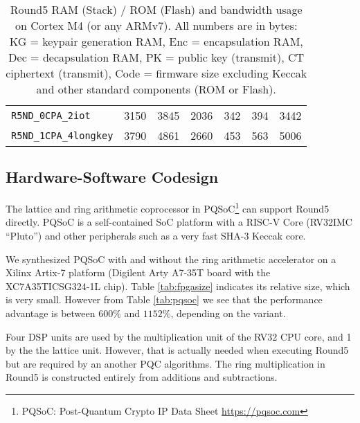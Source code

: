 \documentclass[a4paper]{article}
\begin{document}
\begin{table}
\begin{center}
\begin{tabular}{| l | n{5}{0} n{5}{0} n{5}{0} | n{5}{0} n{5}{0} | n{5}{0} | }
	\verb|R5ND_0CPA_2iot| & 3150  & 3845 & 2036 & 342	& 394	& 3442	\\
	\verb|R5ND_1CPA_4longkey| & 3790 & 4861 & 2660 & 453 & 563	& 5006	\\
	\hline
	\end{tabular}
	\caption{Round5 RAM (Stack) / ROM (Flash) and bandwidth usage on
		Cortex M4 (or any ARMv7). All numbers are in bytes:
		{KG} = keypair generation RAM,	{Enc} = encapsulation RAM,
		{Dec} = decapsulation RAM,		{PK} = public key (transmit),
		{CT} ciphertext (transmit),		{Code} = firmware size excluding
		Keccak and other standard  components (ROM or Flash).}
	\label{tab:m4size}
\end{center}
\end{table}

\subsection{Hardware-Software Codesign}

The lattice and ring arithmetic coprocessor in PQSoC\footnote{PQSoC: 
Post-Quantum Crypto IP Data Sheet \url{https://pqsoc.com}} can support
Round5 directly. PQSoC is a self-contained SoC platform with a 
RISC-V Core (RV32IMC ``Pluto'') and other peripherals such as a very
fast SHA-3 Keccak core. 

We synthesized PQSoC with and without the ring arithmetic accelerator on 
a Xilinx Artix-7 platform (Digilent Arty A7-35T board with the 
XC7A35TICSG324-1L chip). Table \ref{tab:fpgasize} indicates its relative
size, which is very small. However from Table \ref{tab:pqsoc} we see
that the performance advantage is between $600\%$ and $1152\%$, depending
on the variant.

Four DSP units are used by the multiplication unit of the RV32 CPU core, 
and 1 by the the lattice unit. However, that is actually needed when 
executing Round5 but are required by an another PQC algorithms. The ring
multiplication in Round5 is constructed entirely from additions and
subtractions.
\end{document}
